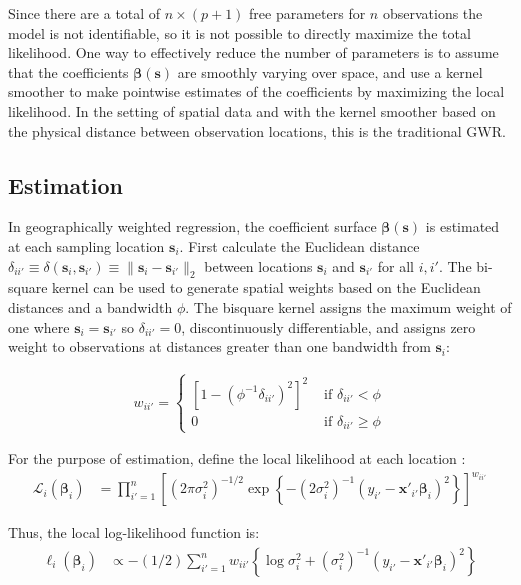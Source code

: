 \documentclass[authoryear, review, 11pt]{elsarticle}
\begin{document}
	Since there are a total of $n \times (p+1)$ free parameters for $n$ observations the model is not identifiable, so it is not possible to directly maximize the total likelihood. One way to effectively reduce the number of parameters is to assume that the coefficients $\bm{\beta}(\bm{s})$ are smoothly varying over space, and use a kernel smoother to make pointwise estimates of the coefficients by maximizing the local likelihood. In the setting of spatial data and with the kernel smoother based on the physical distance between observation locations, this is the traditional GWR.
		
	\subsection{Estimation}		
	In geographically weighted regression, the coefficient surface $\bm{\beta}(\bm{s})$ is estimated at each sampling location $\bm{s}_i$. First calculate the Euclidean distance $\delta_{ii'} \equiv \delta\left(\bm{s}_i, \bm{s}_{i'}\right) \equiv \|\bm{s}_i  -\bm{s}_{i'}\|_2$ between locations $\bm{s}_i$ and $\bm{s}_{i'}$ for all $i, i'$. The bi-square kernel can be used to generate spatial weights based on the Euclidean distances and a bandwidth $\phi$. The bisquare kernel assigns the maximum weight of one where $\bm{s}_i = \bm{s}_{i'}$ so $\delta_{ii'}=0$, discontinuously differentiable, and assigns zero weight to observations at distances greater than one bandwidth from $\bm{s}_i$:
	
	\begin{align}\label{eq:bisquare}
		w_{ii'} = \begin{cases} \left[1-\left(\phi^{-1}\delta_{ii'}\right)^2\right]^2 &\mbox{ if } \delta_{ii'} < \phi \\ 0 &\mbox{ if } \delta_{ii'} \geq \phi \end{cases}
	\end{align}
	
	For the purpose of estimation, define the local likelihood at each location \citep{Fotheringham:2002}:
	\begin{align}\label{eq:local-likelihood}
		\mathcal{L}_i \left(\bm{\beta}_i \right) &= \prod_{i'=1}^n \left[ \left(2 \pi \sigma^2_i  \right)^{-1/2}  \exp\left\{-\left(2 \sigma^2_i\right)^{-1}  \left(y_{i'} - \bm{x}'_{i'} \bm{\beta}_i \right)^2 \right\} \right] ^ {w_{ii'}}
	\end{align}
			
	Thus, the local log-likelihood function is:
	\begin{align}\label{eq:local-log-likelihood}
		\ell_i\left(\bm{\beta}_i\right) &\propto -(1/2) \sum_{i'=1}^n w_{ii'} \left\{ \log{\sigma^2_i}  + \left(\sigma^2_i\right)^{-1}  \left(y_{i'} - \bm{x}'_{i'} \bm{\beta}_i \right)^2 \right\}
	\end{align}
	
\end{document}
